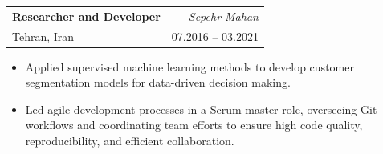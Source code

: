 \documentclass[A4,11pt]{article}
\makeatletter
\newcommand{\CVItem}[1]{
  \item\small{
    {#1 \vspace{-2pt}}
  }
}
\newcommand{\CVSubheading}[4]{
  \vspace{-2pt}\item
    \begin{tabular*}{0.97\textwidth}[t]{l@{\extracolsep{\fill}}r}
      \textbf{#1} & #2 \\
      \small#3 & \small #4 \\
    \end{tabular*}\vspace{-7pt}
}
\newcommand{\CVSubHeadingListStart}{\begin{itemize}[leftmargin=0.5cm, label={}]}
\newcommand{\CVItemListStart}{\begin{itemize}}
\newcommand{\CVItemListEnd}{\end{itemize}\vspace{-5pt}}
\makeatother
\begin{document}
    
    \CVSubheading
    {Researcher and Developer}
    {\textit{Sepehr Mahan}}
    {Tehran, Iran}
    {07.2016 -- 03.2021}
    
    \CVItemListStart
        \CVItem{Applied supervised machine learning methods to develop customer segmentation models for data-driven decision making.}
        \CVItem{Led agile development processes in a Scrum-master role, overseeing Git workflows and coordinating team efforts to ensure high code quality, reproducibility, and efficient collaboration.}
    \CVItemListEnd
    








      
\end{document}
